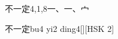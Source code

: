 \begin{entry}{不一定}{4,1,8}{⼀、⼀、⼧}
  \begin{phonetics}{不一定}{bu4 yi2 ding4}[][HSK 2]
  \end{phonetics}
\end{entry}
